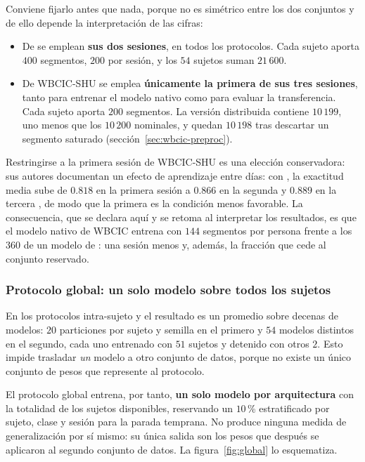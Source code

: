 Conviene fijarlo antes que nada, porque no es simétrico entre los dos conjuntos y de ello
depende la interpretación de las cifras:

\begin{itemize}
  \item De \openbmi{} se emplean \textbf{sus dos sesiones}, en todos los protocolos. Cada
  sujeto aporta $400$ segmentos, $200$ por sesión, y los $54$ sujetos suman $21\,600$.
  \item De WBCIC-SHU se emplea \textbf{únicamente la primera de sus tres sesiones}, tanto
  para entrenar el modelo nativo como para evaluar la transferencia. Cada sujeto aporta
  $200$ segmentos. La versión distribuida contiene $10\,199$, uno menos que los $10\,200$
  nominales, y quedan $10\,198$ tras descartar un segmento saturado
  (sección~\ref{sec:wbcic-preproc}).
\end{itemize}

Restringirse a la primera sesión de WBCIC-SHU es una elección conservadora: sus autores
documentan un efecto de aprendizaje entre días: con \eegnet{}, la exactitud media sube de
$0.818$ en la primera sesión a $0.866$ en la segunda y $0.889$ en la tercera
\cite{yang2025wbcic}, de modo que la primera es la
condición menos favorable. La consecuencia, que se declara aquí y se retoma al interpretar
los resultados, es que el modelo nativo de WBCIC entrena con $144$ segmentos por persona
frente a los $360$ de un modelo de \openbmi{}: una sesión menos y, además, la fracción que
cede al conjunto reservado.

\subsubsection{Protocolo global: un solo modelo sobre todos los sujetos}

En los protocolos intra-sujeto y \loso{} el resultado es un promedio sobre decenas de
modelos: $20$ particiones por sujeto y semilla en el primero y $54$ modelos distintos en el segundo,
cada uno entrenado con $51$ sujetos y detenido con otros $2$. Esto impide trasladar \emph{un} modelo a otro conjunto de
datos, porque no existe un único conjunto de pesos que represente al protocolo.

El protocolo global entrena, por tanto, \textbf{un solo modelo por arquitectura} con la
totalidad de los sujetos disponibles, reservando un $10$\,\% estratificado por sujeto, clase
y sesión para la parada temprana. No produce ninguna medida de generalización por sí mismo:
su única salida son los pesos que después se aplicaron al segundo conjunto de datos. La
figura~\ref{fig:global} lo esquematiza.

